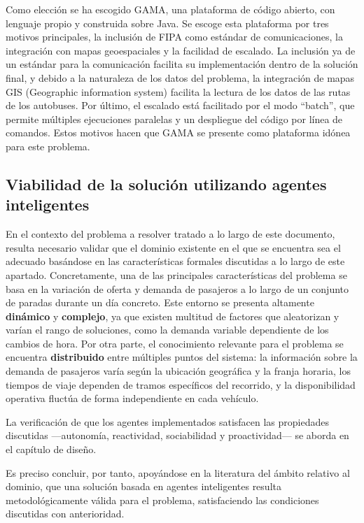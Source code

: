 Como elección se ha escogido GAMA\cite{taillandier2019gama}, una plataforma de código abierto, con lenguaje propio y construida sobre Java. Se escoge esta plataforma por tres motivos principales, la inclusión de FIPA\cite{fipa2002acl} como estándar de comunicaciones, la integración con mapas geoespaciales y la facilidad de escalado. La inclusión ya de un estándar para la comunicación facilita su implementación dentro de la solución final, y debido a la naturaleza de los datos del problema, la integración de mapas GIS (Geographic information system) facilita la lectura de los datos de las rutas de los autobuses. Por último, el escalado está facilitado por el modo \enquote{batch}, que permite múltiples ejecuciones paralelas y un despliegue del código por línea de comandos. Estos motivos hacen que GAMA\cite{taillandier2019gama} se presente como plataforma idónea para este problema.



\subsection{Viabilidad de la solución utilizando agentes inteligentes}

En el contexto del problema a resolver tratado a lo largo de este documento, resulta necesario validar que el dominio existente en el que se encuentra sea el adecuado basándose en las características formales discutidas a lo largo de este apartado. Concretamente, una de las principales características del problema se basa en la variación de oferta y demanda de pasajeros a lo largo de un conjunto de paradas durante un día concreto. Este entorno se presenta altamente \textbf{dinámico} y \textbf{complejo}, ya que existen multitud de factores que aleatorizan y varían el rango de soluciones, como la demanda variable dependiente de los cambios de hora. Por otra parte, el conocimiento relevante para el problema se encuentra \textbf{distribuido} entre múltiples puntos del sistema: la información sobre la demanda de pasajeros varía según la ubicación geográfica y la franja horaria, los tiempos de viaje dependen de tramos específicos del recorrido, y la disponibilidad operativa fluctúa de forma independiente en cada vehículo.

La verificación de que los agentes implementados satisfacen las propiedades discutidas ---autonomía, reactividad, sociabilidad y proactividad--- se aborda en el capítulo de diseño.

Es preciso concluir, por tanto, apoyándose en la literatura del ámbito relativo al dominio, que una solución basada en agentes inteligentes resulta metodológicamente válida para el problema, satisfaciendo las condiciones discutidas con anterioridad.
